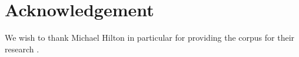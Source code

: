 \documentclass[10pt,conference]{IEEEtran}
\begin{document}

\section{Acknowledgement}
We wish to thank Michael Hilton in particular for providing the corpus for their research \citet{Hilton2016}. 



\vskip 0.2in


\end{document}
